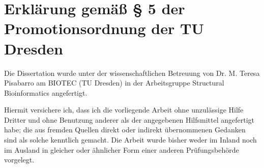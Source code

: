 



\chapter{Erklärung gemäß § 5 der Promotionsordnung der TU Dresden}

Die Dissertation wurde unter der wissenschaftlichen Betreuung von Dr. M. Teresa
Pisabarro am BIOTEC (TU Dresden) in der Arbeitsgruppe Structural Bioinformatics
angefertigt.

Hiermit versichere ich, dass ich die vorliegende Arbeit ohne unzulässige Hilfe
Dritter und ohne Benutzung anderer als der angegebenen Hilfsmittel angefertigt
habe; die aus fremden Quellen direkt oder indirekt übernommenen Gedanken sind
als solche kenntlich gemacht. Die Arbeit wurde bisher weder im Inland noch im
Ausland in gleicher oder ähnlicher Form einer anderen Prüfungsbehörde vorgelegt.

\vspace{2cm}

\noindent
{}
